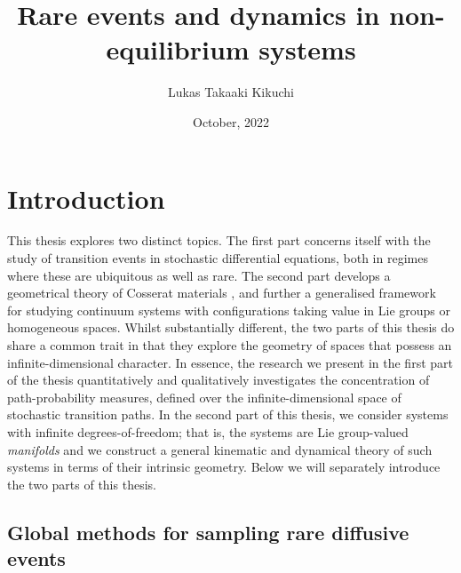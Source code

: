 \documentclass[]{cam-thesis}
\title{Rare events and dynamics in non-equilibrium systems}
\author{Lukas Takaaki Kikuchi}
\date{October, 2022}
\begin{document}
\frontmatter{}









\chapter*{Introduction}

This thesis explores two distinct topics. The first part concerns itself with the study of transition events in stochastic differential equations, both in regimes where these are ubiquitous as well as rare. The second part develops a geometrical theory of Cosserat materials \citep{cosseratTheoryDeformableBodies1909}, and further a generalised framework for studying continuum systems with configurations taking value in Lie groups or homogeneous spaces. Whilst substantially different, the two parts of this thesis do share a common trait in that they explore the geometry of spaces that possess an infinite-dimensional character. In essence, the research we present in the first part of the thesis quantitatively and qualitatively investigates the concentration of path-probability measures, defined over the infinite-dimensional space of stochastic transition paths. In the second part of this thesis, we consider systems with infinite degrees-of-freedom; that is, the systems are Lie group-valued \textit{manifolds} and we construct a general kinematic and dynamical theory of such systems in terms of their intrinsic geometry. Below we will separately introduce the two parts of this thesis.

\section*{\large Global methods for sampling rare diffusive events}
\end{document}
